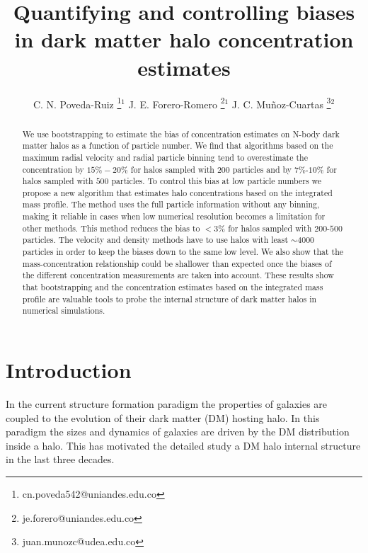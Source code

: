 \documentclass{emulateapj}
\begin{document}
\title{Quantifying and controlling biases in dark matter halo concentration estimates}
\author{
  C. N. Poveda-Ruiz \thanks{cn.poveda542@uniandes.edu.co}$^{1}$
  J. E. Forero-Romero \thanks{je.forero@uniandes.edu.co}$^{1}$
  J. C. Mu\~noz-Cuartas \thanks{juan.munozc@udea.edu.co}$^{2}$
}




\begin{abstract}
We use bootstrapping to estimate the bias of concentration
estimates on N-body dark matter halos as a function of particle
number. 
We find that algorithms based on the maximum radial velocity
and radial particle binning tend to overestimate the concentration by 
$15\%-20\%$ for halos sampled with $200$ particles and by $7\%$-$10\%$
for halos sampled with $500$ particles. 
To control this bias at low particle numbers we propose a new
algorithm that estimates halo concentrations based on the integrated
mass profile.
The method uses the full particle information without any binning,
making it reliable in cases when low numerical resolution becomes a
limitation for other methods.
This method reduces the bias to $< 3\%$ for halos sampled with
$200$-$500$ particles.
The velocity and density methods have to use halos with least $\sim
4000$ particles in order to keep the biases down to the same low
level. 
We also show that the mass-concentration relationship could be
shallower than expected once the biases  of the different
concentration measurements are taken into account. 
These results show that bootstrapping and the concentration estimates
based on the integrated mass profile are valuable tools to probe the
internal structure of dark matter halos in numerical simulations. 
\end{abstract}



\section{Introduction}
\label{sec:introduction}
In the current structure formation paradigm the properties of galaxies
are coupled to the evolution of their dark matter (DM) hosting halo.
In this paradigm the sizes and dynamics of galaxies are driven by
the DM distribution inside a halo. This has motivated the detailed study
a DM halo internal structure in the last three decades. 
\end{document}

